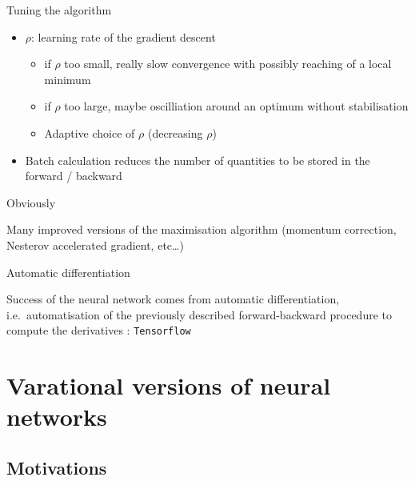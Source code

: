 \documentclass[compress,10pt]{beamer}
\begin{document}
\begin{frame}{Tuning the algorithm}
 

\begin{itemize}
 
\item
  \(\rho\): learning rate of the gradient descent

  \begin{itemize}
  
  \item
    if \(\rho\) too small, really slow convergence with possibly
    reaching of a local minimum\\
  \item
    if \(\rho\) too large, maybe oscilliation around an optimum without
    stabilisation
  \item
    Adaptive choice of \(\rho\) (decreasing $\rho$)
  \end{itemize}
\item
  Batch calculation reduces the number of quantities to be stored in the
  forward / backward
\end{itemize}

\end{frame}
\begin{frame}{Obviously}
\protect\hypertarget{obviously}{}

Many improved versions of the maximisation algorithm (momentum
correction, Nesterov accelerated gradient, etc\ldots{})

\end{frame}

\begin{frame}[fragile]{Automatic differentiation}
\protect\hypertarget{automatic-differentiation}{}

Success of the neural network comes from automatic differentiation,
i.e.~automatisation of the previously described forward-backward
procedure to compute the derivatives : \texttt{Tensorflow}

\end{frame}


\section{Varational versions of neural networks}

\subsection{Motivations}
\end{document}
